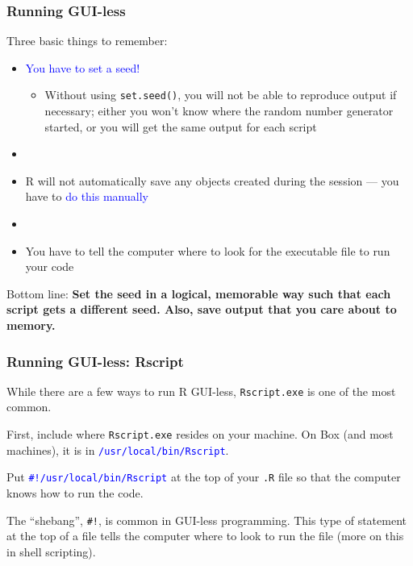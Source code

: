 \documentclass[12pt, 
hyperref={colorlinks=true, linkcolor=blue, urlcolor=cyan}]{beamer}
\newcommand{\myframe}[1]{\begin{frame} \frametitle{#1}}
\begin{document}
\myframe{Running GUI-less}
Three basic things to remember:
\begin{itemize}
\item \textcolor{blue}{You have to set a seed! }
\begin{itemize}
\item Without using \texttt{set.seed()}, you will not be able to reproduce output if necessary; either you won't know where the random number generator started, or you will get the same output for each script
\end{itemize}
\item[]
\item R will not automatically save any objects created during the session --- you have to \textcolor{blue}{do this manually}
\item[]
\item You have to tell the computer where to look for the executable file to run your code
\end{itemize}
Bottom line: \textbf{Set the seed in a logical, memorable way such that each script gets a different seed. Also, save output that you care about to memory.}
\end{frame}

\begin{frame}[fragile]
\frametitle{Running GUI-less: Rscript}
While there are a few ways to run R GUI-less, \texttt{Rscript.exe} is one of the most common.

First, include where \texttt{Rscript.exe} resides on your machine. On Box (and most machines), it is in 
\textcolor{blue}{\texttt{/usr/local/bin/Rscript}}.

Put \textcolor{blue}{\texttt{\#!/usr/local/bin/Rscript}} at the top of your \texttt{.R} file so that the computer knows how to run the code.

The ``shebang'', \texttt{\#!}, is common in GUI-less programming. This type of statement at the top of a file tells the computer where to look to run the file (more on this in shell scripting).

\end{frame}
\end{document}
